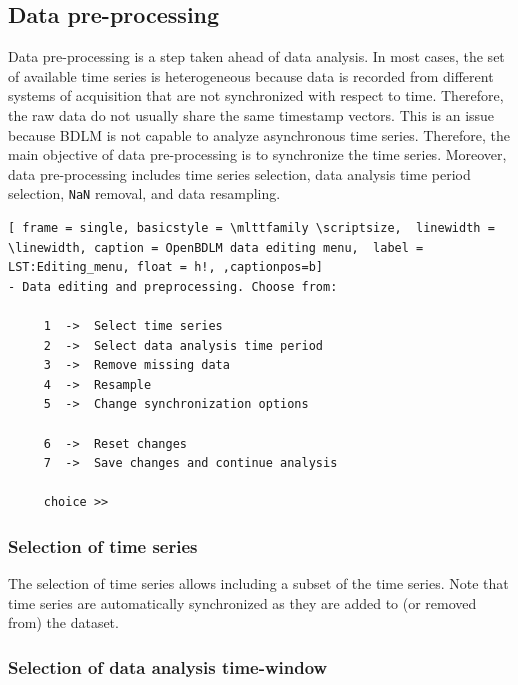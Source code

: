\subsection{Data pre-processing}
\label{S:DATAEDITINGPREPROCESSING}

Data pre-processing is a step taken ahead of data analysis.
In most cases, the set of available time series is heterogeneous because data is recorded from different systems of acquisition that are not synchronized with respect to time.
Therefore, the raw data do not usually share the same timestamp vectors.
This is an issue because BDLM is not capable to analyze asynchronous time series.
Therefore, the main objective of data pre-processing is to synchronize the time series. 
Moreover, data pre-processing includes time series selection, data analysis time period selection, \lstinline[basicstyle = \mlttfamily \small ]!NaN! removal, and data resampling.

\begin{lstlisting}[ frame = single, basicstyle = \mlttfamily \scriptsize,  linewidth = \linewidth, caption = OpenBDLM data editing menu,  label = LST:Editing_menu, float = h!, ,captionpos=b]
- Data editing and preprocessing. Choose from:

     1  ->  Select time series
     2  ->  Select data analysis time period 
     3  ->  Remove missing data
     4  ->  Resample
     5  ->  Change synchronization options

     6  ->  Reset changes
     7  ->  Save changes and continue analysis

     choice >> 
\end{lstlisting}    

\subsubsection{Selection of time series}
\label{SS:SelectionTimeSeries}

The selection of time series allows including a subset of the time series. Note that time series are automatically synchronized as they are added to (or removed from) the dataset.

\subsubsection{Selection of data analysis time-window}
\label{SS:SelectionPeriodAnalysis}

